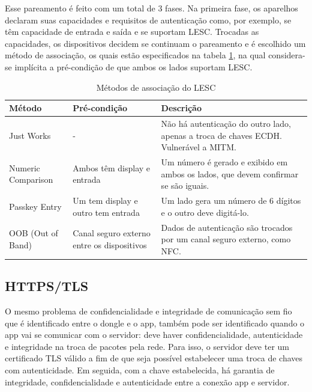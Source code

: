 \documentclass[
	12pt,
	article,			%
	oneside,
	a4paper,
	english,
	brazil				%
	]{abntex2}
\begin{document}
Esse pareamento é feito com um total de 3 fases. Na primeira fase, os aparelhos declaram suas capacidades e requisitos de autenticação como, por exemplo, se têm capacidade
de entrada e saída e se suportam LESC. Trocadas as capacidades, os dispositivos decidem se continuam o pareamento e é escolhido um método de associação, os quais estão especificados
na tabela \ref{lesc:metodos}, na qual considera-se implícita a pré-condição de que ambos os lados suportam LESC.

\begin{table}[H] 	\label{lesc:metodos}
	\centering
	\caption{Métodos de associação do LESC}
	\begin{tabular}{|>{\centering\arraybackslash}m{}|>{\raggedright\arraybackslash}m{}|>{\raggedright\arraybackslash}m{}|}
		\hline
		\textbf{Método} & \textbf{Pré-condição} & \textbf{Descrição} \\
		\hline
		Just Works & - & Não há autenticação do outro lado, apenas a troca de chaves ECDH. Vulnerável a MITM. \\
		\hline
		Numeric Comparison & Ambos têm display e entrada & Um número é gerado e exibido em ambos os lados, que devem confirmar se são iguais. \\
		\hline
		Passkey Entry & Um tem display e outro tem entrada & Um lado gera um número de 6 dígitos e o outro deve digitá-lo. \\
		\hline
		OOB \newline (Out of Band) & Canal seguro externo entre os dispositivos & Dados de autenticação são trocados por um canal seguro externo, como NFC. \\
		\hline
	\end{tabular}
\end{table}

\subsection{HTTPS/TLS}

O mesmo problema de confidencialidade e integridade de comunicação sem fio que é identificado entre o dongle e o app, também pode ser identificado quando o app
vai se comunicar com o servidor: deve haver confidencialidade, autenticidade e integridade na troca de pacotes pela rede. Para isso, o servidor deve ter um certificado
TLS válido a fim de que seja possível estabelecer uma troca de chaves com autenticidade. Em seguida, com a chave estabelecida, há garantia de integridade, confidencialidade
e autenticidade entre a conexão app e servidor.
\end{document}
